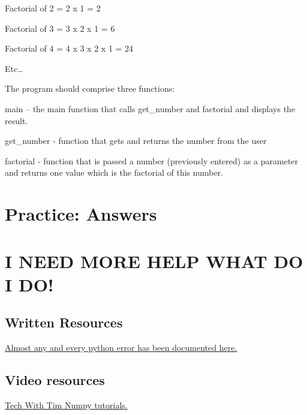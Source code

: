 \documentclass{article}
\begin{document}
	 Factorial of  2 = 2 x 1 = 2 
	 
	 Factorial of  3 = 3 x 2 x 1 = 6 
	 
	 Factorial of  4 = 4 x 3 x 2 x 1 = 24 
	 
	 Etc… 
	 
	 The program should comprise three functions: 
	 
	 main – the main function that calls get\_number and factorial and displays the result.  
	 
	 get\_number -  function that gets and returns the number from the user 
	 
	 factorial - function that is passed a number (previously entered) as a parameter and returns one value which is the factorial of this number. 
	 
	\section{Practice: Answers}
	
	\section{I NEED MORE HELP WHAT DO I DO!}
	\subsection{Written Resources}
	\newline
	\href{https://stackoverflow.com/}{Almost any and every python error has been documented here.}
	\subsection{Video resources}
	 \newline
	\href{https://www.youtube.com/watch?v=biLz7KPgHJA&list=PLzMcBGfZo4-ksMuZFqH5LBytux1_p7bcx}{Tech With Tim Numpy tutorials.}
	
	
	
	
\end{document}
